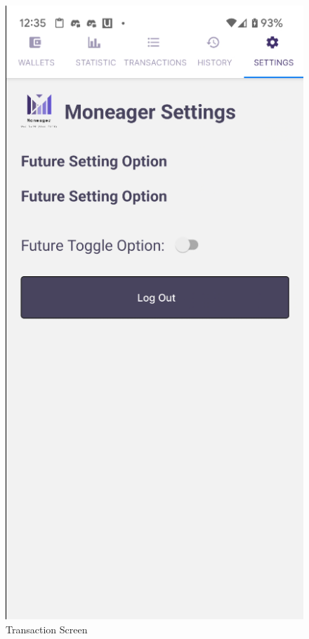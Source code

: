 \begin{figure}[htbp]
\begin{minipage}[t]{0.2\textwidth}
        \caption{Transaction Screen}
        \label{fig:main-menu}
    \end{minipage}
    \hfill
    \begin{minipage}[t]{0.2\textwidth}
        \centering
        \includegraphics[width=\textwidth]{Screen Shots/Moneager/SettingsScreen.png}

\end{minipage}
\end{figure}
